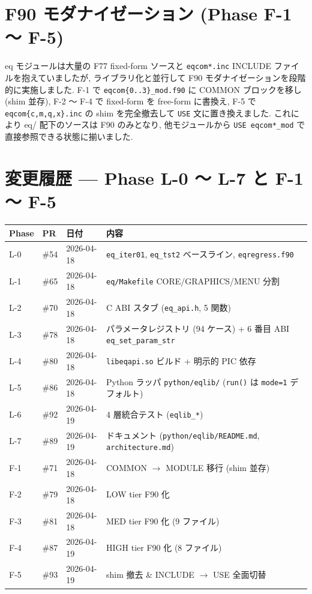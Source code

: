 \documentclass[11pt,a4paper]{report}
\begin{document}
\section{F90 モダナイゼーション (Phase F-1 〜 F-5)}

eq モジュールは大量の F77 fixed-form ソースと \texttt{eqcom*.inc}
INCLUDE ファイルを抱えていましたが, ライブラリ化と並行して F90
モダナイゼーションを段階的に実施しました. F-1 で
\texttt{eqcom\{0..3\}\_mod.f90} に COMMON ブロックを移し (shim 並存),
F-2 〜 F-4 で fixed-form を free-form に書換え, F-5 で
\texttt{eqcom\{c,m,q,x\}.inc} の shim を完全撤去して
\texttt{USE} 文に置き換えました. これにより eq/ 配下のソースは
F90 のみとなり, 他モジュールから \texttt{USE eqcom*\_mod} で
直接参照できる状態に揃いました.

\section{変更履歴 — Phase L-0 〜 L-7 と F-1 〜 F-5}

\begin{center}
\small
\begin{tabular}{@{}lllp{6.0cm}@{}}
\toprule
Phase & PR & 日付 & 内容 \\ \midrule
L-0 & \#54 & 2026-04-18 & \texttt{eq\_iter01}, \texttt{eq\_tst2} ベースライン, \texttt{eqregress.f90} \\
L-1 & \#65 & 2026-04-18 & \texttt{eq/Makefile} CORE/GRAPHICS/MENU 分割 \\
L-2 & \#70 & 2026-04-18 & C ABI スタブ (\texttt{eq\_api.h}, 5 関数) \\
L-3 & \#78 & 2026-04-18 & パラメータレジストリ (94 ケース) + 6 番目 ABI \texttt{eq\_set\_param\_str} \\
L-4 & \#80 & 2026-04-18 & \texttt{libeqapi.so} ビルド + 明示的 PIC 依存 \\
L-5 & \#86 & 2026-04-18 & Python ラッパ \texttt{python/eqlib/} (\texttt{run()} は \texttt{mode=1} デフォルト) \\
L-6 & \#92 & 2026-04-19 & 4 層統合テスト (\texttt{eqlib\_*}) \\
L-7 & \#89 & 2026-04-19 & ドキュメント (\texttt{python/eqlib/README.md}, \texttt{architecture.md}) \\
\midrule
F-1 & \#71 & 2026-04-18 & COMMON $\to$ MODULE 移行 (shim 並存) \\
F-2 & \#79 & 2026-04-18 & LOW tier F90 化 \\
F-3 & \#81 & 2026-04-18 & MED tier F90 化 (9 ファイル) \\
F-4 & \#87 & 2026-04-19 & HIGH tier F90 化 (8 ファイル) \\
F-5 & \#93 & 2026-04-19 & shim 撤去 \& INCLUDE $\to$ USE 全面切替 \\
\bottomrule
\end{tabular}
\end{center}
\end{document}
